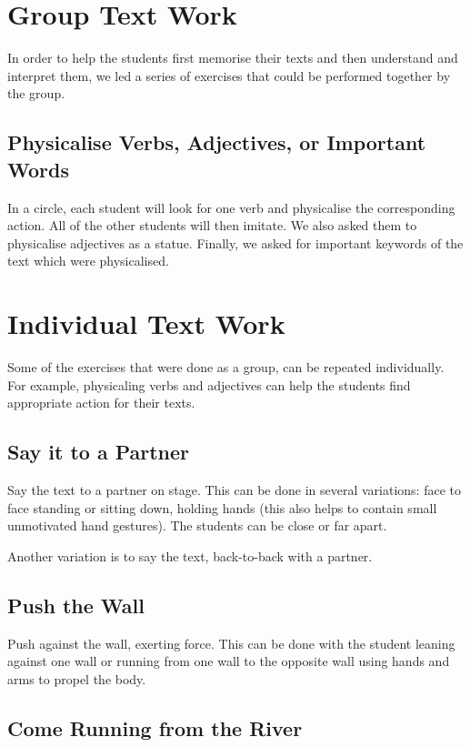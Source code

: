 \documentclass[article,twocolumn,twoside]{memoir}
\begin{document}
\section{Group Text Work}

In order to help the students first memorise their texts and then understand
and interpret them, we led a series of exercises that could be performed
together by the group.

\subsection{Physicalise Verbs, Adjectives, or Important Words}

In a circle, each student will look for one verb and physicalise the
corresponding action. All of the other students will then imitate. We also
asked them to physicalise adjectives as a statue. Finally, we asked for
important keywords of the text which were physicalised.

\section{Individual Text Work}

Some of the exercises that were done as a group, can be repeated individually.
For example, physicaling verbs and adjectives can help the students find
appropriate action for their texts.

\subsection{Say it to a Partner}

Say the text to a partner on stage. This can be done in several variations:
face to face standing or sitting down, holding hands (this also helps to
contain small unmotivated hand gestures). The students can be close or far apart.

Another variation is to say the text, back-to-back with a partner.

\subsection{Push the Wall}

Push against the wall, exerting force. This can be done with the student
leaning against one wall or running from one wall to the opposite wall using
hands and arms to propel the body.

\subsection{Come Running from the River}
\end{document}
